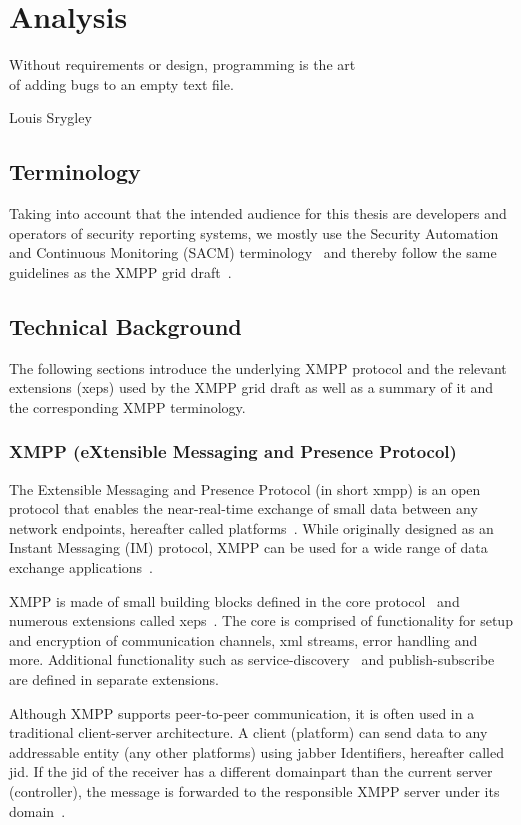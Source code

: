\chapter{Analysis}
\epigraph{Without requirements or design, programming is the art\\of adding bugs to an empty text file.}{Louis Srygley}
\section{Terminology}
Taking into account that the intended audience for this thesis are developers and operators of security reporting systems, 
we mostly use the  Security Automation and Continuous Monitoring (SACM) terminology~\cite{ietf-sacm-terminology-14}
and thereby follow the same guidelines as the XMPP grid draft~\cite{ietf-mile-xmpp-grid-05}.

\section{Technical Background}\label{sec:technical-background}

The following sections introduce the underlying XMPP protocol and the relevant extensions (\glspl{xep}) used by the XMPP grid draft as well as a summary of it and the corresponding XMPP terminology.

\subsection{XMPP (eXtensible Messaging and Presence Protocol)}
The Extensible Messaging and Presence Protocol (in short \gls{xmpp}) is an open protocol that enables the near-real-time exchange of small data between any network endpoints, hereafter called \glspl{platform}~\cite{rfc6120}.
While originally designed as an Instant Messaging (IM) protocol, XMPP can be used for a wide range of data exchange applications~\cite{ieee-xplore-stream-xml-xmpp}.

XMPP is made of small building blocks defined in the core protocol~\cite{rfc6120} and numerous extensions called \glspl{xep}~\cite{xep-0001}.
The core is comprised of functionality for setup and encryption of communication channels, \gls{xml} streams, error handling and more. Additional functionality such as \gls{service-discovery}~\cite{xep-0030} and \gls{publish-subscribe}~\cite{xep-0060} are defined in separate extensions.

Although XMPP supports peer-to-peer communication, it is often used in a traditional client-server architecture.
A client (\gls{platform}) can send data to any addressable entity (any other \glspl{platform}) using \Gls{jabber} Identifiers, hereafter called \gls{jid}. If the \gls{jid} of the receiver has a different domainpart than the current server (\gls{controller}), the message is forwarded to the responsible XMPP server under its domain~\cite{rfc6120}.

